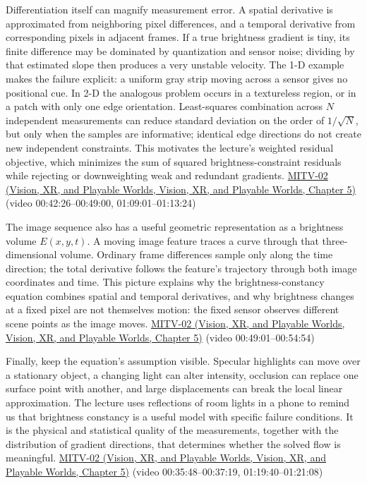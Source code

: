 Differentiation itself can magnify measurement error. A spatial derivative is approximated from neighboring pixel differences, and a temporal derivative from corresponding pixels in adjacent frames. If a true brightness gradient is tiny, its finite difference may be dominated by quantization and sensor noise; dividing by that estimated slope then produces a very unstable velocity. The 1-D example makes the failure explicit: a uniform gray strip moving across a sensor gives no positional cue. In 2-D the analogous problem occurs in a textureless region, or in a patch with only one edge orientation. Least-squares combination across \(N\) independent measurements can reduce standard deviation on the order of \(1/\sqrt{N}\), but only when the samples are informative; identical edge directions do not create new independent constraints. This motivates the lecture's weighted residual objective, which minimizes the sum of squared brightness-constraint residuals while rejecting or downweighting weak and redundant gradients. \href{../07-Vision-XR-and-Playable-Worlds/main.pdf\#nameddest=04-visual-computing-ii-ch036-mitv-02---image-formation-perspective-projection-time-derivative-motion-field}{MITV-02 (Vision, XR, and Playable Worlds, Vision, XR, and Playable Worlds, Chapter 5)} (video 00:42:26--00:49:00, 01:09:01--01:13:24)

The image sequence also has a useful geometric representation as a brightness volume \(E(x,y,t)\). A moving image feature traces a curve through that three-dimensional volume. Ordinary frame differences sample only along the time direction; the total derivative follows the feature's trajectory through both image coordinates and time. This picture explains why the brightness-constancy equation combines spatial and temporal derivatives, and why brightness changes at a fixed pixel are not themselves motion: the fixed sensor observes different scene points as the image moves. \href{../07-Vision-XR-and-Playable-Worlds/main.pdf\#nameddest=04-visual-computing-ii-ch036-mitv-02---image-formation-perspective-projection-time-derivative-motion-field}{MITV-02 (Vision, XR, and Playable Worlds, Vision, XR, and Playable Worlds, Chapter 5)} (video 00:49:01--00:54:54)

Finally, keep the equation's assumption visible. Specular highlights can move over a stationary object, a changing light can alter intensity, occlusion can replace one surface point with another, and large displacements can break the local linear approximation. The lecture uses reflections of room lights in a phone to remind us that brightness constancy is a useful model with specific failure conditions. It is the physical and statistical quality of the measurements, together with the distribution of gradient directions, that determines whether the solved flow is meaningful. \href{../07-Vision-XR-and-Playable-Worlds/main.pdf\#nameddest=04-visual-computing-ii-ch036-mitv-02---image-formation-perspective-projection-time-derivative-motion-field}{MITV-02 (Vision, XR, and Playable Worlds, Vision, XR, and Playable Worlds, Chapter 5)} (video 00:35:48--00:37:19, 01:19:40--01:21:08)

